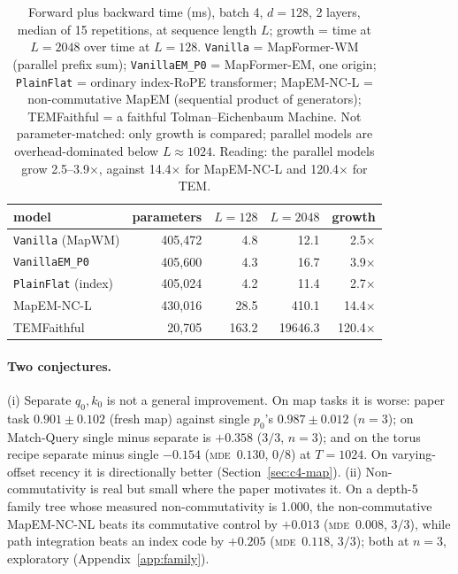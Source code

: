 \documentclass[10pt]{article}
\newcommand{\mde}{\textsc{mde}}
\newcommand{\arm}[1]{\texttt{#1}}
\begin{document}
\begin{table}[t]
\centering
\small
\captionsetup{font=footnotesize,skip=4pt}
\caption{Forward plus backward time (ms), batch 4, $d=128$, 2 layers, median of 15 repetitions, at sequence length $L$; growth = time at $L=2048$ over time at $L=128$. \arm{Vanilla} = MapFormer-WM (parallel prefix sum); \arm{VanillaEM\_P0} = MapFormer-EM, one origin; \arm{PlainFlat} = ordinary index-RoPE transformer; MapEM-NC-L = non-commutative MapEM (sequential product of generators); TEMFaithful = a faithful Tolman--Eichenbaum Machine. Not parameter-matched: only growth is compared; parallel models are overhead-dominated below $L\approx1024$. Reading: the parallel models grow 2.5--3.9$\times$, against 14.4$\times$ for MapEM-NC-L and 120.4$\times$ for TEM.}
\label{tab:timing}
\begin{tabular}{@{}lrrrr@{}}
\toprule
model & parameters & $L=128$ & $L=2048$ & growth \\
\midrule
\arm{Vanilla} (MapWM)    & 405,472 & 4.8   & 12.1    & 2.5$\times$ \\
\arm{VanillaEM\_P0}      & 405,600 & 4.3   & 16.7    & 3.9$\times$ \\
\arm{PlainFlat} (index)  & 405,024 & 4.2   & 11.4    & 2.7$\times$ \\
MapEM-NC-L               & 430,016 & 28.5  & 410.1   & 14.4$\times$ \\
TEMFaithful              & 20,705  & 163.2 & 19646.3 & 120.4$\times$ \\
\bottomrule
\end{tabular}
\end{table}

\paragraph{Two conjectures.} (i) Separate $q_0,k_0$ is not a general improvement. On map tasks it is
worse: paper task $0.901\pm0.102$ (fresh map) against single $p_0$'s $0.987\pm0.012$ ($n=3$); on Match-Query single minus
separate is $+0.358$ ($3/3$, $n=3$); and on the torus
recipe separate minus single $-0.154$ (\mde\ $0.130$, $0/8$) at $T=1024$. On varying-offset recency
it is directionally better (Section~\ref{sec:c4-map}). %
(ii) Non-commutativity is real but small where the paper motivates it. On a depth-5 family tree whose
measured non-commutativity is 1.000, the non-commutative MapEM-NC-NL beats its commutative control by
$+0.013$ (\mde\ $0.008$, $3/3$), while path integration beats an index code by $+0.205$ (\mde\ $0.118$,
$3/3$); both at $n=3$, exploratory (Appendix~\ref{app:family}). %
\end{document}
